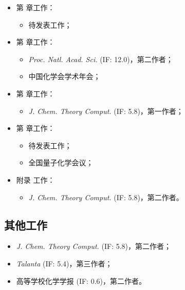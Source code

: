 \begin{itemize}[nosep]
    \item 第  章工作：
    \begin{itemize}[nosep]
        \item 待发表工作；
    \end{itemize}
    \item 第  章工作：
    \begin{itemize}[nosep]
        \item \emph{Proc. Natl. Acad. Sci.} (IF: 12.0)，第二作者；%
        \item 中国化学会学术年会；
    \end{itemize}
    \item 第  章工作：
    \begin{itemize}[nosep]
        \item \emph{J. Chem. Theory Comput.} (IF: 5.8)，第一作者；%
    \end{itemize}
    \item 第  章工作：
    \begin{itemize}[nosep]
        \item 待发表工作；
        \item 全国量子化学会议；
    \end{itemize}
    \item 附录  工作：
    \begin{itemize}[nosep]
        \item \emph{J. Chem. Theory Comput.} (IF: 5.8)，第二作者。%
    \end{itemize}
\end{itemize}

\subsection*{其他工作}

\begin{itemize}[nosep]
    \item \emph{J. Chem. Theory Comput.} (IF: 5.8)，第二作者；%
    \item \emph{Talanta} (IF: 5.4)，第三作者；%
    \item 高等学校化学学报 (IF: 0.6)，第二作者。%
\end{itemize}


